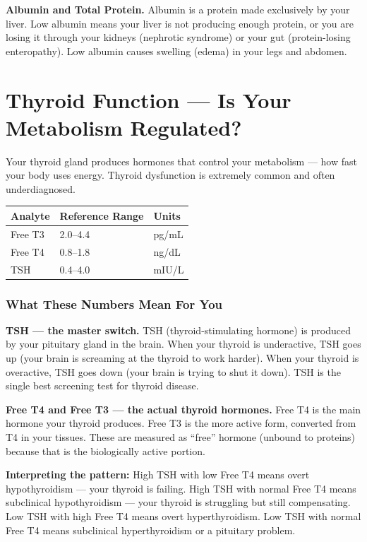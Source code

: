 \textbf{Albumin and Total Protein.} Albumin is a protein made exclusively by your liver. Low albumin means your liver is not producing enough protein, or you are losing it through your kidneys (nephrotic syndrome) or your gut (protein-losing enteropathy). Low albumin causes swelling (edema) in your legs and abdomen.

\clearpage
\section{Thyroid Function --- Is Your Metabolism Regulated?}

Your thyroid gland produces hormones that control your metabolism --- how fast your body uses energy. Thyroid dysfunction is extremely common and often underdiagnosed.

\begin{longtable}{@{}lll@{}}
\toprule
\textbf{Analyte} & \textbf{Reference Range} & \textbf{Units} \\
\midrule
Free T3 & 2.0--4.4 & pg/mL \\
Free T4 & 0.8--1.8 & ng/dL \\
TSH & 0.4--4.0 & mIU/L \\
\bottomrule
\end{longtable}

\subsubsection{What These Numbers Mean For You}

\textbf{TSH --- the master switch.} TSH (thyroid-stimulating hormone) is produced by your pituitary gland in the brain. When your thyroid is underactive, TSH goes up (your brain is screaming at the thyroid to work harder). When your thyroid is overactive, TSH goes down (your brain is trying to shut it down). TSH is the single best screening test for thyroid disease.

\textbf{Free T4 and Free T3 --- the actual thyroid hormones.} Free T4 is the main hormone your thyroid produces. Free T3 is the more active form, converted from T4 in your tissues. These are measured as ``free'' hormone (unbound to proteins) because that is the biologically active portion.

\textbf{Interpreting the pattern:} High TSH with low Free T4 means overt hypothyroidism --- your thyroid is failing. High TSH with normal Free T4 means subclinical hypothyroidism --- your thyroid is struggling but still compensating. Low TSH with high Free T4 means overt hyperthyroidism. Low TSH with normal Free T4 means subclinical hyperthyroidism or a pituitary problem.

